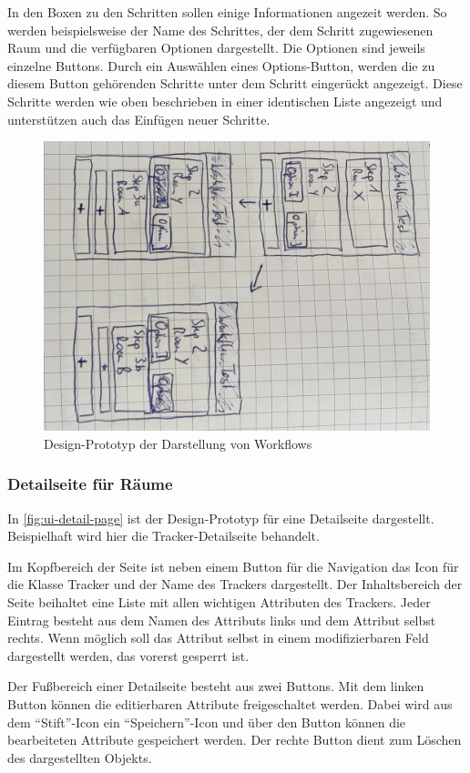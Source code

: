 In den Boxen zu den Schritten sollen einige Informationen angezeit werden.
So werden beispielsweise der Name des Schrittes, der dem Schritt zugewiesenen Raum und die
verfügbaren Optionen dargestellt.
Die Optionen sind jeweils einzelne Buttons.
Durch ein Auswählen eines Options-Button, werden die zu diesem Button gehörenden Schritte unter dem Schritt eingerückt angezeigt.
Diese Schritte werden wie oben beschrieben in einer identischen Liste angezeigt und unterstützen auch das Einfügen neuer Schritte.

\begin{figure}[h!tbp]
	\includegraphics[width=.7\textwidth]{images/ui-prototype/workflow.jpg}
	\centering
	\caption{Design-Prototyp der Darstellung von Workflows}
	\label{fig:ui-workflow}
\end{figure}

\subsubsection{Detailseite für Räume} \label{sec:app-room}
In \autoref{fig:ui-detail-page} ist der Design-Prototyp für eine Detailseite dargestellt.
Beispielhaft wird hier die Tracker-Detailseite behandelt.

Im Kopfbereich der Seite ist neben einem Button für die Navigation das Icon für die Klasse Tracker und der Name des Trackers dargestellt.
Der Inhaltsbereich der Seite beihaltet eine Liste mit allen wichtigen Attributen des Trackers.
Jeder Eintrag besteht aus dem Namen des Attributs links und dem Attribut selbst rechts.
Wenn möglich soll das Attribut selbst in einem modifizierbaren Feld dargestellt werden, das vorerst gesperrt ist.

Der Fußbereich einer Detailseite besteht aus zwei Buttons.
Mit dem linken Button können die editierbaren Attribute freigeschaltet werden.
Dabei wird aus dem \enquote{Stift}-Icon ein \enquote{Speichern}-Icon und über den Button können die bearbeiteten Attribute gespeichert werden.
Der rechte Button dient zum Löschen des dargestellten Objekts.


